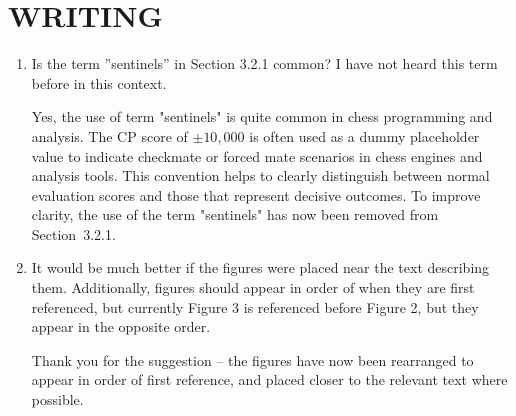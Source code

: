 \documentclass{amsart}
\theoremstyle{definition}
\theoremstyle{remark}
\numberwithin{equation}{section}
\begin{document}
        \section{WRITING}
        \begin{enumerate}[label={(\arabic*)}]
            \item  Is the term ”sentinels” in Section 3.2.1 common? I have not heard this term before in this context.

            {\color{gray}\small Yes, the use of term "sentinels" is quite common in chess programming and analysis. The CP score of $\pm 10,000$ is often used as a dummy placeholder value to indicate checkmate or forced mate scenarios in chess engines and analysis tools. This convention helps to clearly distinguish between normal evaluation scores and those that represent decisive outcomes. To improve clarity, the use of the term "sentinels" has now been removed from Section~3.2.1.}

            \item It would be much better if the figures were placed near the text describing them. Additionally, figures should appear in order of when they are first referenced, but currently Figure 3 is referenced before Figure 2, but they appear in the opposite order.
            
            {\color{gray}\small Thank you for the suggestion -- the figures have now been rearranged to appear in order of first reference, and placed closer to the relevant text where possible.}
        \end{enumerate}
\end{document}

